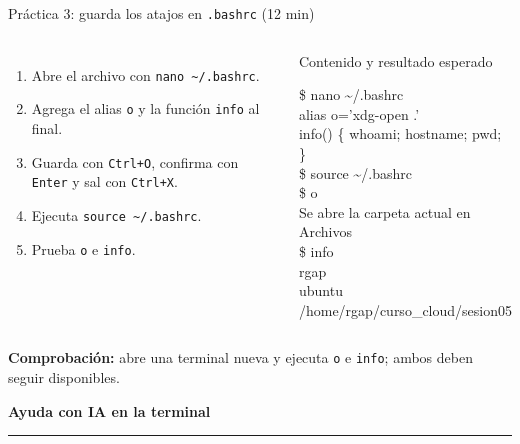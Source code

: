 \documentclass[aspectratio=169,10pt,c]{beamer}
\begin{document}
\begin{frame}{Práctica 3: guarda los atajos en \texttt{.bashrc} \textnormal{\small(12 min)}}
\begin{columns}[T,onlytextwidth]
\begin{enumerate}\setlength\itemsep{4pt}\small
  \item Abre el archivo con \texttt{nano \textasciitilde/.bashrc}.
  \item Agrega el alias \texttt{o} y la función \texttt{info} al final.
  \item Guarda con \texttt{Ctrl+O}, confirma con \texttt{Enter} y sal con \texttt{Ctrl+X}.
  \item Ejecuta \texttt{source \textasciitilde/.bashrc}.
  \item Prueba \texttt{o} e \texttt{info}.
\end{enumerate}
\begin{exampleblock}{Contenido y resultado esperado}
\begin{terminal}
\$ nano \textasciitilde/.bashrc\\
alias o='xdg-open .'\\
info() \{ whoami; hostname; pwd; \}\\
\$ source \textasciitilde/.bashrc\\
\$ o\\
Se abre la carpeta actual en Archivos\\
\$ info\\
rgap\\
ubuntu\\
/home/rgap/curso\_cloud/sesion05
\end{terminal}
\end{exampleblock}
\end{columns}
\small\textbf{Comprobación:} abre una terminal nueva y ejecuta \texttt{o} e \texttt{info}; ambos deben seguir disponibles.
\end{frame}

\begin{frame}[plain]
\vfill
\begin{center}
{\fontsize{29}{34}\selectfont\bfseries Ayuda con IA en la terminal}\par
\vspace{4mm}
{\color{utpRojo}\rule{8.5cm}{1.2pt}}
\end{center}
\vfill
\end{frame}
\end{document}
